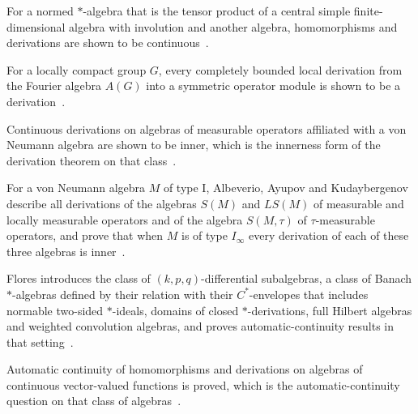 For a normed $*$-algebra that is the tensor product of a central simple finite-dimensional algebra with involution and another algebra, homomorphisms and derivations are shown to be continuous~\cite{WlContinuityOfHomomorphismsAndDe2019}.

For a locally compact group $G$, every completely bounded local derivation from the Fourier algebra $A(G)$ into a symmetric operator module is shown to be a derivation~\cite{WlBoundedAndCompletelyBoundedLoc2019}.

Continuous derivations on algebras of measurable operators affiliated with a von Neumann algebra are shown to be inner, which is the innerness form of the derivation theorem on that class~\cite{WlInnernessOfContinuousDerivatio2013}.

For a von Neumann algebra $M$ of type I, Albeverio, Ayupov and Kudaybergenov describe all derivations of the algebras $S(M)$ and $LS(M)$ of measurable and locally measurable operators and of the algebra $S(M,\tau)$ of $\tau$-measurable operators, and prove that when $M$ is of type $I_\infty$ every derivation of each of these three algebras is inner~\cite{WlStructureOfDerivationsOnVariou2009}.

Flores introduces the class of $(k,p,q)$-differential subalgebras, a class of Banach $*$-algebras defined by their relation with their $C^*$-envelopes that includes normable two-sided $*$-ideals, domains of closed $*$-derivations, full Hilbert algebras and weighted convolution algebras, and proves automatic-continuity results in that setting~\cite{WlHarmonicAnalysisAndAutomaticCo2025}.

Automatic continuity of homomorphisms and derivations on algebras of continuous vector-valued functions is proved, which is the automatic-continuity question on that class of algebras~\cite{WlAutomaticContinuityOfHomomorph2020}.

